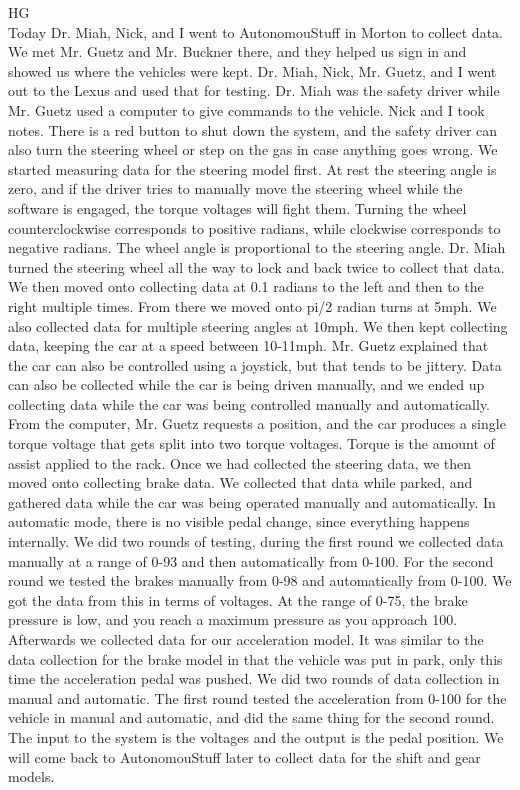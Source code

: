 \documentclass[fontsize=11pt, %
                             paper=letter, %
                             openany, %
                             captions=tableheading,
                             index=totoc,
                             hyperref]{labbook}
\def\currentYear{2021}
\begin{document}
\begin{addmargin}[0cm]{0cm}
\labday{Thursday, October 7, \currentYear}
HG\\
Today Dr. Miah, Nick, and I went to AutonomouStuff in Morton to collect data. We met Mr. Guetz and Mr. Buckner there, and they helped us sign in and showed us where the vehicles were kept. Dr. Miah, Nick, Mr. Guetz, and I went out to the Lexus and used that for testing. Dr. Miah was the safety driver while Mr. Guetz used a computer to give commands to the vehicle. Nick and I took notes. There is a red button to shut down the system, and the safety driver can also turn the steering wheel or step on the gas in case anything goes wrong. We started measuring data for the steering model first. At rest the steering angle is zero, and if the driver tries to manually move the steering wheel while the software is engaged, the torque voltages will fight them. Turning the wheel counterclockwise corresponds to positive radians, while clockwise corresponds to negative radians. The wheel angle is proportional to the steering angle. Dr. Miah turned the steering wheel all the way to lock and back twice to collect that data. We then moved onto collecting data at 0.1 radians to the left and then to the right multiple times. From there we moved onto pi/2 radian turns at 5mph. We also collected data for multiple steering angles at 10mph. We then kept collecting data, keeping the car at a speed between 10-11mph. Mr. Guetz explained that the car can also be controlled using a joystick, but that tends to be jittery. Data can also be collected while the car is being driven manually, and we ended up collecting data while the car was being controlled manually and automatically. From the computer, Mr. Guetz requests a position, and the car produces a single torque voltage that gets split into two torque voltages. Torque is the amount of assist applied to the rack. Once we had collected the steering data, we then moved onto collecting brake data. We collected that data while parked, and gathered data while the car was being operated manually and automatically. In automatic mode, there is no visible pedal change, since everything happens internally. We did two rounds of testing, during the first round we collected data manually at a range of 0-93 and then automatically from 0-100. For the second round we tested the brakes manually from 0-98 and automatically from 0-100. We got the data from this in terms of voltages. At the range of 0-75, the brake pressure is low, and you reach a maximum pressure as you approach 100. Afterwards we collected data for our acceleration model. It was similar to the data collection for the brake model in that the vehicle was put in park, only this time the acceleration pedal was pushed. We did two rounds of data collection in manual and automatic. The first round tested the acceleration from 0-100 for the vehicle in manual and automatic, and did the same thing for the second round. The input to the system is the voltages and the output is the pedal position. We will come back to AutonomouStuff later to collect data for the shift and gear models. 


\end{addmargin}
\end{document}
